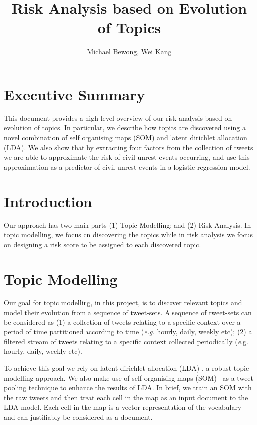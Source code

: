 \documentclass{article}
\title{Risk Analysis based on Evolution of Topics}
\author{Michael Bewong, Wei Kang}
\begin{document}
\maketitle


\section*{Executive Summary}
This document provides a high level overview of our risk analysis  based on evolution of topics. In particular, we describe how topics are discovered using a novel combination of self organising maps (SOM) and latent dirichlet allocation (LDA). We also show that by extracting four factors from the collection of tweets we are able to approximate the risk of civil unrest events occurring, and use this approximation as a predictor of civil unrest events in a logistic regression model.
\section{Introduction}
Our approach has two main parts (1) Topic Modelling; and (2) Risk Analysis. In topic modelling, we focus on discovering the topics while in risk analysis we focus on designing a risk score to be assigned to each discovered topic. %


\section{Topic Modelling}
Our goal for topic modelling, in this project, is to discover relevant topics and model their evolution from a sequence of tweet-sets. A sequence of tweet-sets can be considered as (1) a collection of tweets relating to a specific context over a period of time partitioned according to time (\emph{e.g.} hourly, daily, weekly etc); (2) a filtered stream of tweets relating to a specific context  collected periodically ({\emph e.g.} hourly, daily, weekly etc).  

To achieve this goal we rely on latent dirichlet allocation (LDA) \cite{Blei03}, a robust topic modelling approach. We also make use of self organising maps (SOM)~\cite{Kohonen82} as a tweet pooling technique to enhance the results of LDA. In brief, we train an SOM with the raw tweets and then treat each cell in the map as an input document to the LDA model. Each cell in the map is a vector representation of the vocabulary and can justifiably be considered as a document.
\end{document}
